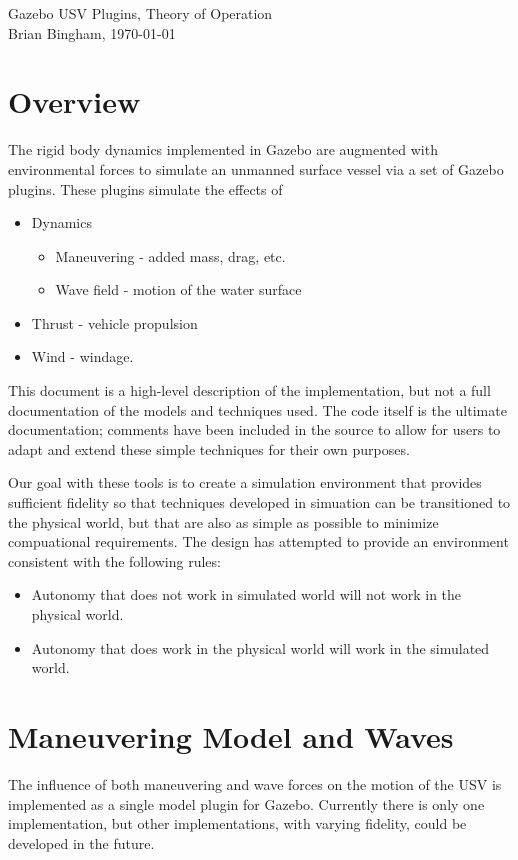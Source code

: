 \documentclass[11pt]{article}
\newcommand{\doctitle}{Gazebo USV Plugins, Theory of Operation}
\begin{document}
  

\newpage
\setcounter{page}{1}
\begin{center}
  {\huge \doctitle} \\
  \vspace{1ex}
  Brian Bingham,  \today 
\end{center}


\section{Overview}
The rigid body dynamics implemented in Gazebo are augmented with environmental forces to simulate an unmanned surface vessel via a set of Gazebo plugins.  These plugins simulate the effects of
\begin{itemize}
\item Dynamics
  \begin{itemize}
  \item Maneuvering - added mass, drag, etc.
  \item Wave field - motion of the water surface
  \end{itemize}
\item Thrust - vehicle propulsion
\item Wind - windage.
  \end{itemize}

This document is a high-level description of the implementation, but not a full documentation of the models and techniques used.  The code itself is the ultimate documentation; comments have been included in the source to allow for users to adapt and extend these simple techniques for their own purposes.

Our goal with these tools is to create a simulation environment that provides sufficient fidelity so that techniques developed in simuation can be transitioned to the physical world, but that are also as simple as possible to minimize compuational requirements.  The design has attempted to provide an environment consistent with the following rules:
\begin{itemize}
\item Autonomy that does not work in simulated world will not work in the physical world.
\item Autonomy that does work in the physical world will work in the simulated world.
\end{itemize}

\section{Maneuvering Model and Waves}
The influence of both maneuvering and wave forces on the motion of the USV is implemented as a single model plugin for Gazebo.  Currently there is only one implementation, but other implementations, with varying fidelity, could be developed in the future.
\end{document}
